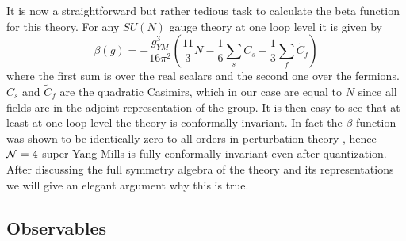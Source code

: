 It is now a straightforward but rather tedious task to calculate the beta function for this theory. 
For any $SU(N)$ gauge theory at one loop level it is given by \cite{Gross:1973}
\begin{equation}
	\beta(g) = - \frac{g_{YM}^3}{16\pi^2} \left( \frac{11}{3} N - \frac{1}{6} \sum_s C_s - \frac{1}{3} \sum_f \tilde{C}_f \right)
\end{equation}
where the first sum is over the real scalars and the second one over the fermions. 
$C_s$ and $\tilde{C}_f$ are the quadratic Casimirs, which in our case are equal to $N$ since all fields are in the adjoint representation of the group. 
It is then easy to see that at least at one loop level the theory is conformally invariant. 
In fact the $\beta$ function was shown to be identically zero to all orders in perturbation theory \cite{Sohnius:1981ab,Mandelstam:1983, Brink:1983}, hence $\mathcal{N}=4$ super Yang-Mills is fully conformally invariant even after quantization. 
After discussing the full symmetry algebra of the theory and its representations we will give an elegant argument why this is true.

\subsection{Observables}

